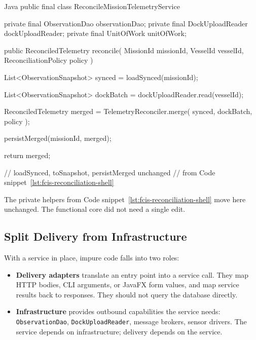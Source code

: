 \begin{ridercode}{Java}
public final class ReconcileMissionTelemetryService
{
    private final ObservationDao observationDao;
    private final DockUploadReader dockUploadReader;
    private final UnitOfWork unitOfWork;

    public ReconciledTelemetry reconcile(
        MissionId missionId,
        VesselId vesselId,
        ReconciliationPolicy policy
    )
    {
        List<ObservationSnapshot> synced =
            loadSynced(missionId);

        List<ObservationSnapshot> dockBatch =
            dockUploadReader.read(vesselId);

        ReconciledTelemetry merged =
            TelemetryReconciler.merge(
                synced,
                dockBatch,
                policy
            );

        persistMerged(missionId, merged);

        return merged;
    }

    // loadSynced, toSnapshot, persistMerged unchanged
    // from Code snippet~\ref{lst:fcis-reconciliation-shell}
}
\end{ridercode}
\label{lst:fcis-reconciliation-service}

The private helpers from Code snippet~\ref{lst:fcis-reconciliation-shell} move here unchanged. The functional core did not need a single edit.

\subsection{Split Delivery from Infrastructure}
\label{sec:fcis_evolution_split}

With a service in place, impure code falls into two roles:
\begin{itemize}
    \item \textbf{Delivery adapters} translate an entry point into a service call. They map HTTP bodies, CLI arguments, or JavaFX form values, and map service results back to responses. They should not query the database directly.
    \item \textbf{Infrastructure} provides outbound capabilities the service needs: \texttt{ObservationDao}, \texttt{DockUploadReader}, message brokers, sensor drivers. The service depends on infrastructure; delivery depends on the service.
\end{itemize}

